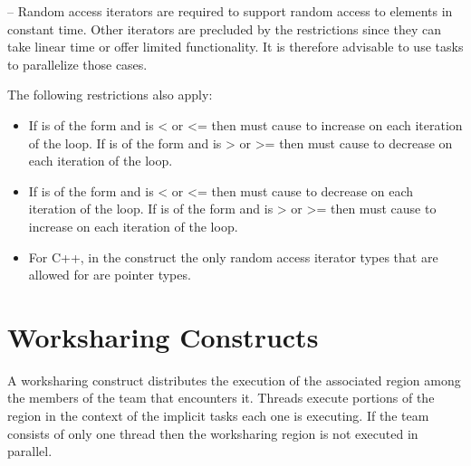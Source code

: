 \notestart
\noteheader – Random access iterators are required to support random access to elements in 
constant time. Other iterators are precluded by the restrictions since they can take linear 
time or offer limited functionality. It is therefore advisable to use tasks to parallelize 
those cases. 


\noteend

\restrictions
The following restrictions also apply:

\begin{itemize}
\item If  is of the form   
 and  is < or <= then  must cause  to increase on each 
iteration of the loop. If  is of 
the form    and  
is > or >= then  must cause  to decrease on each iteration of the loop.

\item If  is of the form   
 and  is < or <= then 
 must cause  to decrease on each iteration of the loop. If  is of 
the form    and  
is > or >= then  must cause  to increase on each iteration of the loop.

\item For C++, in the  construct the only random access iterator types that are 
allowed for  are pointer types. 
\end{itemize}
\ccppspecificend










\section{Worksharing Constructs}
\label{sec:Worksharing Constructs}
A worksharing construct distributes the execution of the associated region among the 
members of the team that encounters it. Threads execute portions of the region in the 
context of the implicit tasks each one is executing. If the team consists of only one 
thread then the worksharing region is not executed in parallel.

